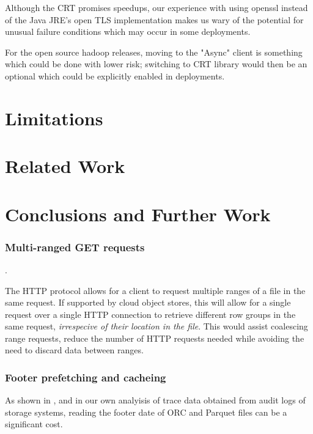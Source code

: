\documentclass[manuscript]{acmart}
\begin{document}
Although the CRT promises speedups, our experience with using openssl instead of
the Java JRE's open TLS implementation makes us wary of the potential for
unusual failure conditions which may occur in some deployments.

For the open source hadoop releases, moving to the "Async" client is something
which could be done with lower risk; switching to CRT library would then be
an optional which could be explicitly enabled in deployments.


\section{Limitations}
\label{sec:limitations}


\section{Related Work}
\label{sec:related-work}

\section{Conclusions and Further Work}
\label{sec:conclusions}

\subsubsection{Multi-ranged GET requests}.

The HTTP protocol allows for a client to request multiple ranges of a file
in the same request.
If supported by cloud object stores, this will allow for a single request
over a single HTTP connection to retrieve different row groups in the same
request, \emph{irrespecive of their location in the file}.
This would assist coalescing range requests, reduce the number of HTTP requests
needed while avoiding the need to discard data between ranges.

\subsubsection{Footer prefetching and cacheing}

As shown in \cite{zeng2023empirical}, and in our own analyisis of trace data
obtained from audit logs of storage systems, reading the footer date of ORC and Parquet
files can be a significant cost.
\end{document}
